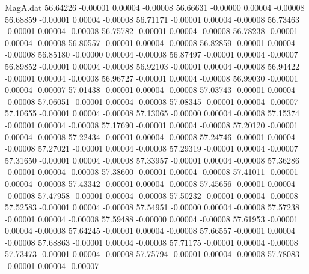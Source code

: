 \begin{filecontents}{MagA.dat}
  56.64226   -0.00001    0.00004   -0.00008
  56.66631   -0.00000    0.00004   -0.00008
  56.68859   -0.00001    0.00004   -0.00008
  56.71171   -0.00001    0.00004   -0.00008
  56.73463   -0.00001    0.00004   -0.00008
  56.75782   -0.00001    0.00004   -0.00008
  56.78238   -0.00001    0.00004   -0.00008
  56.80557   -0.00001    0.00004   -0.00008
  56.82859   -0.00001    0.00004   -0.00008
  56.85180   -0.00000    0.00004   -0.00008
  56.87497   -0.00001    0.00004   -0.00007
  56.89852   -0.00001    0.00004   -0.00008
  56.92103   -0.00001    0.00004   -0.00008
  56.94422   -0.00001    0.00004   -0.00008
  56.96727   -0.00001    0.00004   -0.00008
  56.99030   -0.00001    0.00004   -0.00007
  57.01438   -0.00001    0.00004   -0.00008
  57.03743   -0.00001    0.00004   -0.00008
  57.06051   -0.00001    0.00004   -0.00008
  57.08345   -0.00001    0.00004   -0.00007
  57.10655   -0.00001    0.00004   -0.00008
  57.13065   -0.00000    0.00004   -0.00008
  57.15374   -0.00001    0.00004   -0.00008
  57.17690   -0.00001    0.00004   -0.00008
  57.20120   -0.00001    0.00004   -0.00008
  57.22434   -0.00001    0.00004   -0.00008
  57.24746   -0.00001    0.00004   -0.00008
  57.27021   -0.00001    0.00004   -0.00008
  57.29319   -0.00001    0.00004   -0.00007
  57.31650   -0.00001    0.00004   -0.00008
  57.33957   -0.00001    0.00004   -0.00008
  57.36286   -0.00001    0.00004   -0.00008
  57.38600   -0.00001    0.00004   -0.00008
  57.41011   -0.00001    0.00004   -0.00008
  57.43342   -0.00001    0.00004   -0.00008
  57.45656   -0.00001    0.00004   -0.00008
  57.47958   -0.00001    0.00004   -0.00008
  57.50232   -0.00001    0.00004   -0.00008
  57.52583   -0.00001    0.00004   -0.00008
  57.54951   -0.00000    0.00004   -0.00008
  57.57238   -0.00001    0.00004   -0.00008
  57.59488   -0.00000    0.00004   -0.00008
  57.61953   -0.00001    0.00004   -0.00008
  57.64245   -0.00001    0.00004   -0.00008
  57.66557   -0.00001    0.00004   -0.00008
  57.68863   -0.00001    0.00004   -0.00008
  57.71175   -0.00001    0.00004   -0.00008
  57.73473   -0.00001    0.00004   -0.00008
  57.75794   -0.00001    0.00004   -0.00008
  57.78083   -0.00001    0.00004   -0.00007
\end{filecontents}

